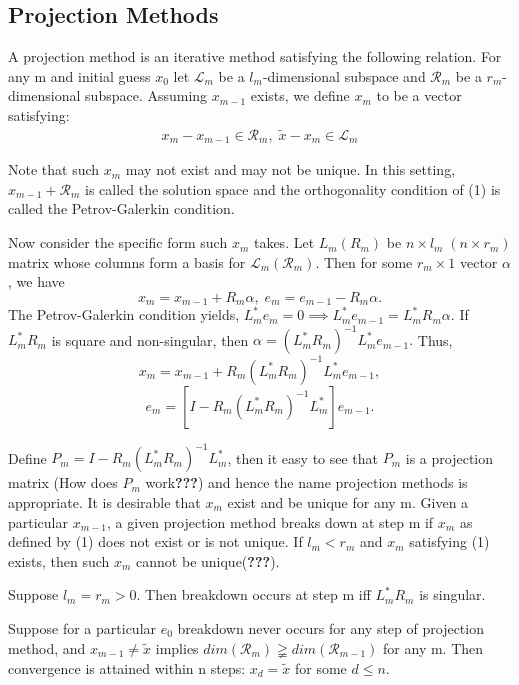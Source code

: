\documentclass[10pt,a4paper]{article}
\begin{document}
\subsection{Projection Methods}
A projection method is an iterative method satisfying the following relation. For any m and initial guess $x_0$ let $\mathcal{L}_m$ be a $l_m$-dimensional subspace and $\mathcal{R}_m$ be a $r_m$-dimensional subspace. Assuming $x_{m-1}$ exists, we define $x_m$ to be a vector satisfying:
\begin{align}
x_m-x_{m-1}\in\mathcal{R}_m,\;\tilde{x}-x_m\in\mathcal{L}_m
\end{align}

Note that such $x_m$ may not exist and may not be unique. In this setting, $x_{m-1}+\mathcal{R}_m$ is called the solution space and the orthogonality condition of (1) is called the Petrov-Galerkin condition.

Now consider the specific form such $x_m$ takes. Let $L_m(R_m)$ be $n\times l_m\;(n\times r_m)$ matrix whose columns form a basis for $\mathcal{L}_m(\mathcal{R}_m)$. Then for some $r_m\times 1$ vector $\alpha$, we have $$x_m=x_{m-1}+R_m\alpha,\;e_m=e_{m-1}-R_m\alpha.$$ 
The Petrov-Galerkin condition yields, $L^*_me_m=0\implies L^*_me_{m-1}=L^*_mR_m\alpha.$ If $L^*_mR_m$ is square and non-singular, then $\alpha=(L^*_mR_m)^{-1}L^*_me_{m-1}.$ Thus,
$$x_m=x_{m-1}+R_m(L^*_mR_m)^{-1}L^*_me_{m-1},$$
$$e_m=[I-R_m(L^*_mR_m)^{-1}L^*_m]e_{m-1}.$$

Define $P_m=I-R_m(L^*_mR_m)^{-1}L^*_m$, then it easy to see that $P_m$ is a projection matrix (How does $P_m$ work\textbf{???}) and hence the name projection methods is appropriate. It is desirable that $x_m$ exist and be unique for any m. Given a particular $x_{m-1}$, a given projection method breaks down at step m if $x_m$ as defined by (1) does not exist or is not unique. If $l_m<r_m$ and $x_m$ satisfying (1) exists, then such $x_m$ cannot be unique(\textbf{???}).

\begin{theorem}
Suppose $l_m=r_m>0.$ Then breakdown occurs at step m iff $L^*_mR_m$ is singular.
\end{theorem}

\begin{corollary}
Suppose for a particular $e_0$ breakdown never occurs for any step of projection method, and $x_{m-1}\neq \tilde{x}$ implies $dim(\mathcal{R}_m)\gneqq dim(\mathcal{R}_{m-1})$ for any m. Then convergence is attained within n steps: $x_d=\tilde{x}$ for some $d\le n$.
\end{corollary}
\end{document}
